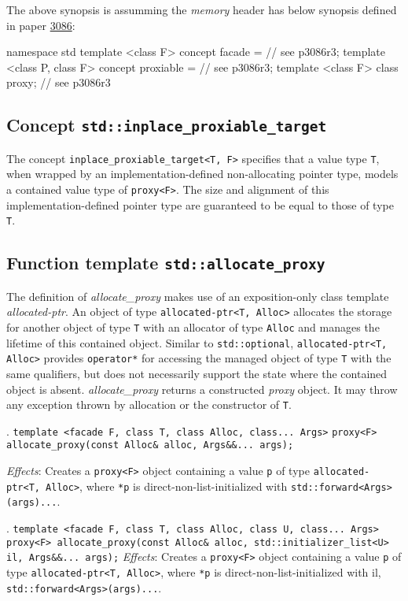 \documentclass[10pt, a4paper, oneside]{article}
\begin{document}
\noindent The above synopsis is assumming the \textit{memory} header has below synopsis defined in paper \href{https://wg21.link/p3086}{3086}:
\begin{codeblock}
namespace std {
  template <class F>
    concept facade = // see p3086r3;
  template <class P, class F>
    concept proxiable = // see p3086r3;
  template <class F>
    class proxy; // see p3086r3
}

\end{codeblock}

\subsection{Concept \texttt{std::inplace\_proxiable\_target}}
The concept \verb|inplace_proxiable_target<T, F>| specifies that a value type \verb|T|,
when wrapped by an implementation\hyp{}defined non\hyp{}allocating pointer type,
models a contained value type of \verb|proxy<F>|.
The size and alignment of this implementation-defined pointer type are guaranteed to be equal to those of type \verb|T|.

\subsection{Function template \texttt{std::allocate\_proxy}}
The definition of \textit{allocate\_proxy} makes use of an exposition-only class template \textit{allocated-ptr}.
An object of type \verb|allocated-ptr<T, Alloc>| allocates the storage for another object of type \verb|T| with an allocator of type \verb|Alloc| and manages the lifetime of this contained object.
Similar to \verb|std::optional|, \verb|allocated-ptr<T, Alloc>| provides \verb|operator*| for accessing the managed object of type \verb|T| with the same qualifiers,
but does not necessarily support the state where the contained object is absent.\smallbreak
\textit{allocate\_proxy} returns a constructed \textit{proxy} object. It may throw any exception thrown by allocation or the constructor of \verb|T|.
\medbreak

. \verb|template <facade F, class T, class Alloc, class... Args>|\smallbreak
\verb|proxy<F> allocate_proxy(const Alloc& alloc, Args&&... args);|

\textit{Effects}: Creates a \verb|proxy<F>| object containing a value \verb|p| of type \verb|allocated-ptr<T, Alloc>|,
where \verb|*p| is direct-non-list-initialized with \verb|std::forward<Args>(args)...|.
\medbreak

. \verb|template <facade F, class T, class Alloc, class U, class... Args>|\smallbreak
\verb|proxy<F> allocate_proxy(const Alloc& alloc, std::initializer_list<U> il, Args&&... args);|
\medbreak
\textit{Effects}: Creates a \verb|proxy<F>| object containing a value \verb|p| of type \verb|allocated-ptr<T, Alloc>|,
where \verb|*p| is direct-non-list-initialized with il, \verb|std::forward<Args>(args)...|.
\medbreak
\end{document}
